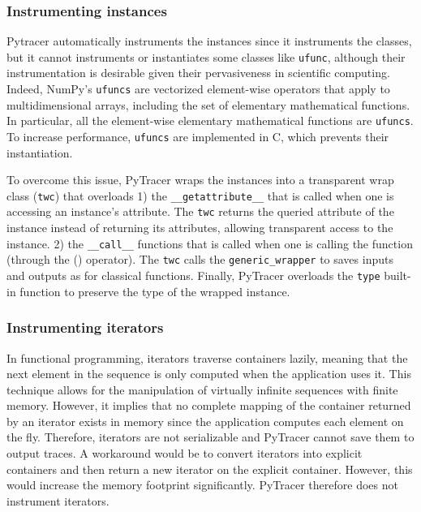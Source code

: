 \documentclass[11pt]{article}
\newcommand{\pytracer}[0]{PyTracer\xspace}
\begin{document}
\subsubsection{Instrumenting instances}

Pytracer automatically instruments the instances since it instruments the classes, but it cannot instruments or instantiates some classes like \texttt{ufunc}, although their instrumentation is desirable given their pervasiveness in scientific computing. 
Indeed, NumPy's \texttt{ufuncs} are vectorized element-wise operators that apply to multidimensional arrays, 
including the set of elementary mathematical functions.
In particular, all the element-wise elementary mathematical functions are \texttt{ufuncs}.  
To increase performance, \texttt{ufuncs} are implemented in C, which prevents their instantiation.

To overcome this issue, \pytracer wraps the instances into a transparent wrap class (\texttt{twc}) that overloads
1) the \texttt{\_\_getattribute\_\_} that is called when one is accessing an instance's attribute.
The \texttt{twc} returns the queried attribute of the instance instead of returning its attributes, allowing transparent access to the instance. 2) the \texttt{\_\_call\_\_} functions that is called when one 
is calling the function (through the () operator). The \texttt{twc} calls the \texttt{generic\_wrapper} to saves 
inputs and outputs as for classical functions. Finally, \pytracer overloads the \texttt{type} built-in function
to preserve the type of the wrapped instance.

\subsubsection{Instrumenting iterators}

In functional programming, iterators traverse containers lazily, meaning that the next element in the sequence is only computed when the application uses it. This technique allows for the manipulation of virtually infinite sequences with finite memory. However, it implies that no complete mapping of the container returned by an iterator exists in memory since the application computes each element on the fly. Therefore, iterators are not serializable and \pytracer cannot save them to output traces. 
A workaround would be to convert iterators into explicit containers and then return a new iterator on the explicit container. However, this would increase the memory footprint significantly. \pytracer therefore does not instrument iterators.
\end{document}
